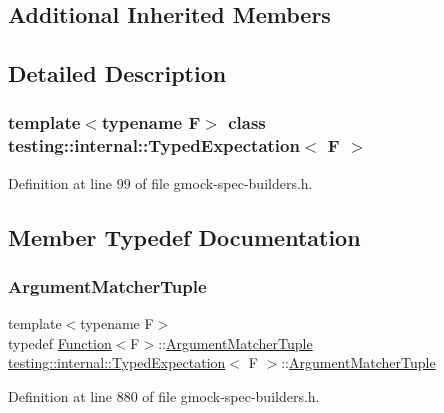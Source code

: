 \subsection*{Additional Inherited Members}


\subsection{Detailed Description}
\subsubsection*{template$<$typename F$>$\newline
class testing\+::internal\+::\+Typed\+Expectation$<$ F $>$}



Definition at line 99 of file gmock-\/spec-\/builders.\+h.



\subsection{Member Typedef Documentation}
\mbox{\label{classtesting_1_1internal_1_1TypedExpectation_a8f10e3906761cc5c10fa3561c6e8938e}} 
\subsubsection{\texorpdfstring{Argument\+Matcher\+Tuple}{ArgumentMatcherTuple}}
{\footnotesize\ttfamily template$<$typename F$>$ \\
typedef \hyperlink{structtesting_1_1internal_1_1Function}{Function}$<$F$>$\+::\hyperlink{classtesting_1_1internal_1_1TypedExpectation_a8f10e3906761cc5c10fa3561c6e8938e}{Argument\+Matcher\+Tuple} \hyperlink{classtesting_1_1internal_1_1TypedExpectation}{testing\+::internal\+::\+Typed\+Expectation}$<$ F $>$\+::\hyperlink{classtesting_1_1internal_1_1TypedExpectation_a8f10e3906761cc5c10fa3561c6e8938e}{Argument\+Matcher\+Tuple}}



Definition at line 880 of file gmock-\/spec-\/builders.\+h.

